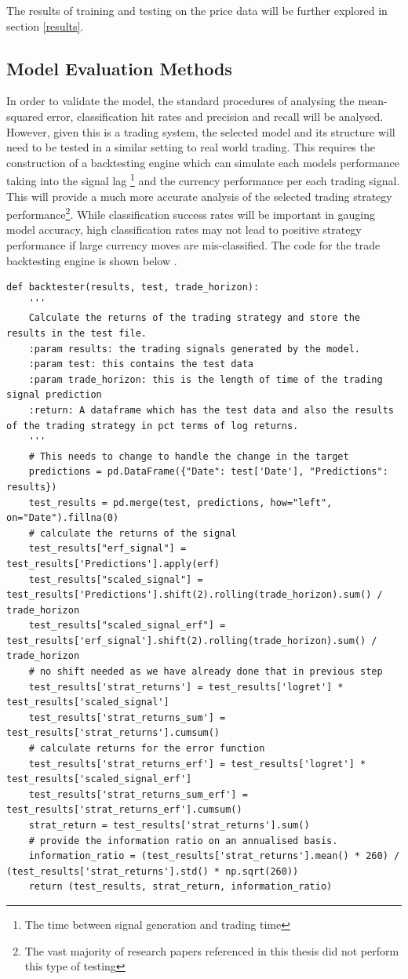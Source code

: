 \documentclass[11pt]{article}
\begin{document}
The results of training and testing on the price data will be further explored in section \ref{results}. 

\subsection{Model Evaluation Methods} \label{backy}
In order to validate the model, the standard procedures of analysing the mean-squared error, classification hit rates and precision and recall will be analysed. However, given this is a trading system, the selected model and its structure will need to be tested in a similar setting to real world trading. This requires the construction of a backtesting engine which can simulate each models performance taking into the signal lag \footnote{ The time between signal generation and trading time} and the currency performance per each trading signal. This will provide a much more accurate analysis of the selected trading strategy performance\footnote{The vast majority of research papers referenced in this thesis did not perform this type of testing}. While classification success rates will be important in gauging model accuracy, high classification rates may not lead to positive strategy performance if large currency moves are mis-classified. The code for the trade backtesting engine is shown below .
\clearpage
\begin{lstlisting}
def backtester(results, test, trade_horizon):
    '''
    Calculate the returns of the trading strategy and store the results in the test file.
    :param results: the trading signals generated by the model.
    :param test: this contains the test data
    :param trade_horizon: this is the length of time of the trading signal prediction
    :return: A dataframe which has the test data and also the results of the trading strategy in pct terms of log returns.
    '''
    # This needs to change to handle the change in the target
    predictions = pd.DataFrame({"Date": test['Date'], "Predictions": results})
    test_results = pd.merge(test, predictions, how="left", on="Date").fillna(0)
    # calculate the returns of the signal
    test_results["erf_signal"] = test_results['Predictions'].apply(erf)
    test_results["scaled_signal"] = test_results['Predictions'].shift(2).rolling(trade_horizon).sum() / trade_horizon
    test_results["scaled_signal_erf"] = test_results['erf_signal'].shift(2).rolling(trade_horizon).sum() / trade_horizon
    # no shift needed as we have already done that in previous step
    test_results['strat_returns'] = test_results['logret'] * test_results['scaled_signal']
    test_results['strat_returns_sum'] = test_results['strat_returns'].cumsum()
    # calculate returns for the error function
    test_results['strat_returns_erf'] = test_results['logret'] * test_results['scaled_signal_erf']
    test_results['strat_returns_sum_erf'] = test_results['strat_returns_erf'].cumsum()
    strat_return = test_results['strat_returns'].sum()
    # provide the information ratio on an annualised basis.
    information_ratio = (test_results['strat_returns'].mean() * 260) / (test_results['strat_returns'].std() * np.sqrt(260))
    return (test_results, strat_return, information_ratio)
\end{lstlisting}
\end{document}
